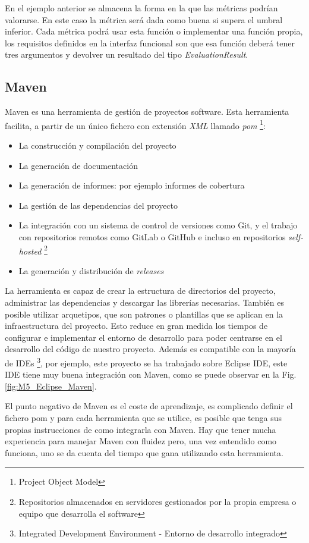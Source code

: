 En el ejemplo anterior se almacena la forma en la que las métricas podrían valorarse. En este caso la métrica será dada como buena si supera el umbral inferior. Cada métrica podrá usar esta función o implementar una función propia, los requisitos definidos en la interfaz funcional son que esa función deberá tener tres argumentos y devolver un resultado del tipo \textit{EvaluationResult}.

\subsection{Maven}
Maven es una herramienta de gestión de proyectos software. Esta herramienta facilita, a partir de un único fichero con extensión \textit{XML} llamado \textit{pom} \footnote{Project Object Model}:
\begin{itemize}
	\item La construcción y compilación del proyecto
	\item La generación de documentación
	\item La generación de informes: por ejemplo informes de cobertura
	\item La gestión de las dependencias del proyecto
	\item La integración con un sistema de control de versiones como Git, y el trabajo con repositorios remotos como GitLab o GitHub e incluso en repositorios \textit{self-hosted} \footnote{Repositorios almacenados en servidores gestionados por la propia empresa o equipo que desarrolla el software}
	\item La generación y distribución de \textit{releases}
\end{itemize}
La herramienta es capaz de crear la estructura de directorios del proyecto, administrar las dependencias y descargar las librerías necesarias. También es posible utilizar arquetipos, que son patrones o plantillas que se aplican en la infraestructura del proyecto. Esto reduce en gran medida los tiempos de configurar e implementar el entorno de desarrollo para poder centrarse en el desarrollo del código de nuestro proyecto. Además es compatible con la mayoría de IDEs \footnote{Integrated Development Environment - Entorno de desarrollo integrado}, por ejemplo, este proyecto se ha trabajado sobre Eclipse IDE, este IDE tiene muy buena integración con Maven, como se puede observar en la Fig. \ref{fig:M5_Eclipse_Maven}.


El punto negativo de Maven es el coste de aprendizaje, es complicado definir el fichero pom y para cada herramienta que se utilice, es posible que tenga sus propias instrucciones de como integrarla con Maven. Hay que tener mucha experiencia para manejar Maven con fluidez pero, una vez entendido como funciona, uno se da cuenta del tiempo que gana utilizando esta herramienta.

